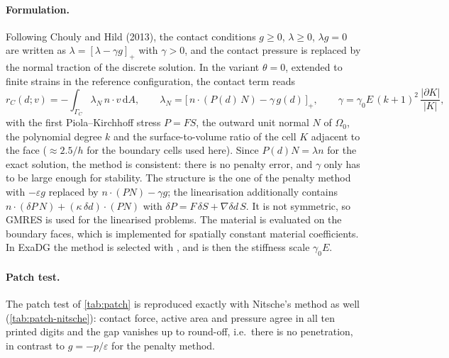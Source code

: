 \documentclass[11pt,a4paper]{article}
\newcommand{\dd}{\,\mathrm{d}}
\begin{document}
\paragraph{Formulation.}
Following Chouly and Hild (2013), the contact conditions $g\ge0$, $\lambda\ge0$, $\lambda g=0$ are
written as $\lambda = [\lambda - \gamma g]_+$ with $\gamma>0$, and the contact pressure is replaced
by the normal traction of the discrete solution. In the variant $\theta=0$, extended to finite
strains in the reference configuration, the contact term reads
\begin{equation}
  r_C(d; v) = -\int_{\Gamma_C} \lambda_N\, n\cdot v \dd A, \qquad
  \lambda_N = \bigl[\, n\cdot(P(d)\,N) - \gamma\, g(d)\, \bigr]_+, \qquad
  \gamma = \gamma_0 E\,(k+1)^2\,\frac{|\partial K|}{|K|},
\end{equation}
with the first Piola--Kirchhoff stress $P = FS$, the outward unit normal $N$ of $\Omega_0$, the
polynomial degree $k$ and the surface-to-volume ratio of the cell $K$ adjacent to the face
($\approx 2.5/h$ for the boundary cells used here). Since $P(d)N=\lambda n$ for the exact solution,
the method is consistent: there is no penalty error, and $\gamma$ only has to be large enough for
stability. The structure is the one of the penalty method with $-\varepsilon g$ replaced by
$n\cdot(PN)-\gamma g$; the linearisation additionally contains
$n\cdot(\delta P\, N) + (\kappa\,\delta d)\cdot(PN)$ with $\delta P = F\,\delta S + \nabla\delta d\, S$.
It is not symmetric, so GMRES is used for the linearised problems. The material is evaluated on the
boundary faces, which is implemented for spatially constant material coefficients. In ExaDG the
method is selected with , and
 is then the stiffness scale $\gamma_0 E$.

\paragraph{Patch test.}
The patch test of \cref{tab:patch} is reproduced exactly with Nitsche's method as well
(\cref{tab:patch-nitsche}): contact force, active area and pressure agree in all ten printed digits
and the gap vanishes up to round-off, i.e.\ there is no penetration, in contrast to
$g=-p/\varepsilon$ for the penalty method.
\end{document}
